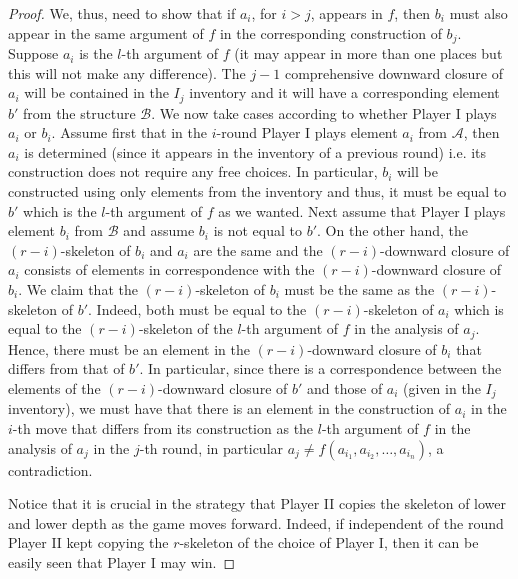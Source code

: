 \documentclass[10pt,a4paper]{amsart}
\begin{document}
\begin{proof}
We, thus, need to show that if $a_i$, for $i>j$, appears in $f$, then $b_i$ must also appear in the same argument of $f$ in the corresponding construction of $b_j$. Suppose $a_i$ is the $l$-th argument of $f$ (it may appear in more than one places but this will not make any difference). The $j-1$ comprehensive downward closure of $a_i$ will be contained in the $I_j$ inventory and it will have a corresponding element $b'$ from the structure $\mathcal{B}$. We now take cases according to whether Player I plays $a_i$ or $b_i$. Assume first that in the $i$-round Player I plays element $a_i$ from $\mathcal{A}$, then $a_i$ is determined (since it appears in the inventory of a previous round) i.e. its construction does not require any free choices. In particular, $b_i$ will be constructed using only elements from the inventory and thus, it must be equal to $b'$ which is the $l$-th argument of $f$ as we wanted. Next assume that Player I plays element $b_i$ from $\mathcal{B}$ and assume $b_i$ is not equal to $b'$. On the other hand, the $(r-i)$-skeleton of $b_i$ and $a_i$ are the same and the $(r-i)$-downward closure of $a_i$ consists of elements in correspondence with the $(r-i)$-downward closure of $b_i$. We claim that  the $(r-i)$-skeleton of $b_i$ must be the same as the $(r-i)$-skeleton of $b'$. Indeed, both must be equal to the $(r-i)$-skeleton of $a_i$ which is equal to the $(r-i)$-skeleton of the $l$-th argument of $f$ in the analysis of $a_j$. Hence, there must be an element in the $(r-i)$-downward closure of $b_i$ that differs from that of $b'$. In particular, since there is a correspondence between the elements of the $(r-i)$-downward closure of $b'$ and those of $a_i$ (given in the $I_j$ inventory), we must have that there is an element in the construction of $a_i$ in the $i$-th move that differs from its construction as the $l$-th argument of $f$ in the analysis of $a_j$ in the $j$-th round, in particular $a_j\neq f(a_{i_1}, a_{i_2}, \ldots, a_{i_n})$, a contradiction.    
    
Notice that it is crucial in the strategy that Player II copies the skeleton of lower and lower depth as the game moves forward. Indeed, if independent of the round Player II kept copying the $r$-skeleton of the choice of Player I, then it can be easily seen that Player I may win.  


\end{proof}
\end{document}
